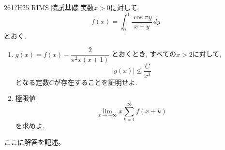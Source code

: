 \begin{prob}{261}{\hosi ?}{H25 RIMS 院試基礎}
実数$x>0$に対して, 
\[f(x) = \int_{0}^{1} \dfrac{\cos{\pi y}}{x+y} \, dy\]
とおく. 
\begin{enumerate}[label=(\roman*)]
\item $g(x) = f(x) - \dfrac{2}{\pi^2 x(x+1)}$ とおくとき, すべての$x>2$に対して, 
\[|g(x)| \leq \dfrac{C}{x^3}\]
となる定数$C$が存在することを証明せよ. 
\item 極限値
\[\lim_{x\to +\infty} x\sum_{k=1}^{\infty} f(x+k) \]
を求めよ. 
\end{enumerate}
\end{prob}

ここに解答を記述。